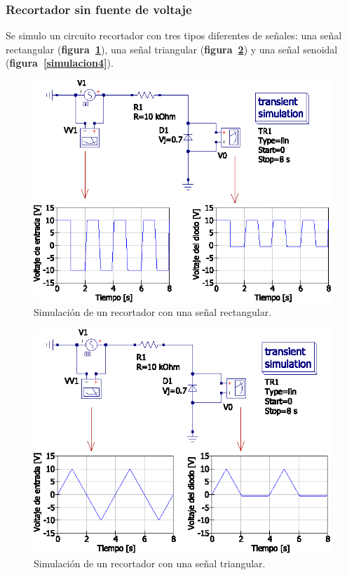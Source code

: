 \documentclass[letter,twoside,11pt]{article}
\begin{document}
\subsubsection{Recortador sin fuente de voltaje}
Se simulo un circuito recortador con tres tipos diferentes de señales: una señal
rectangular (\textbf{figura~\ref{simulacion2}}), una señal triangular
(\textbf{figura~\ref{simulacion3}}) y una señal senoidal
(\textbf{figura~\ref{simulacion4}}).

\begin{figure}[!h]
\centering
\includegraphics[scale=0.97]{simulacion/practica1.2.eps}
\caption{Simulación de un recortador con una señal rectangular.}
\label{simulacion2}
\end{figure}

\begin{figure}[!h]
\centering
\includegraphics[scale=0.97]{simulacion/practica1.3.eps}
\caption{Simulación de un recortador con una señal triangular.}
\label{simulacion3}
\end{figure}
\end{document}
